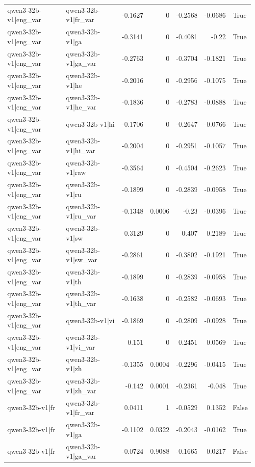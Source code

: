\begin{table}
\begin{tabular}{l l r r r r l}
qwen3-32b-v1|eng_var & qwen3-32b-v1|fr_var & -0.1627 & 0 & -0.2568 & -0.0686 & True \\
qwen3-32b-v1|eng_var & qwen3-32b-v1|ga & -0.3141 & 0 & -0.4081 & -0.22 & True \\
qwen3-32b-v1|eng_var & qwen3-32b-v1|ga_var & -0.2763 & 0 & -0.3704 & -0.1821 & True \\
qwen3-32b-v1|eng_var & qwen3-32b-v1|he & -0.2016 & 0 & -0.2956 & -0.1075 & True \\
qwen3-32b-v1|eng_var & qwen3-32b-v1|he_var & -0.1836 & 0 & -0.2783 & -0.0888 & True \\
qwen3-32b-v1|eng_var & qwen3-32b-v1|hi & -0.1706 & 0 & -0.2647 & -0.0766 & True \\
qwen3-32b-v1|eng_var & qwen3-32b-v1|hi_var & -0.2004 & 0 & -0.2951 & -0.1057 & True \\
qwen3-32b-v1|eng_var & qwen3-32b-v1|raw & -0.3564 & 0 & -0.4504 & -0.2623 & True \\
qwen3-32b-v1|eng_var & qwen3-32b-v1|ru & -0.1899 & 0 & -0.2839 & -0.0958 & True \\
qwen3-32b-v1|eng_var & qwen3-32b-v1|ru_var & -0.1348 & 0.0006 & -0.23 & -0.0396 & True \\
qwen3-32b-v1|eng_var & qwen3-32b-v1|sw & -0.3129 & 0 & -0.407 & -0.2189 & True \\
qwen3-32b-v1|eng_var & qwen3-32b-v1|sw_var & -0.2861 & 0 & -0.3802 & -0.1921 & True \\
qwen3-32b-v1|eng_var & qwen3-32b-v1|th & -0.1899 & 0 & -0.2839 & -0.0958 & True \\
qwen3-32b-v1|eng_var & qwen3-32b-v1|th_var & -0.1638 & 0 & -0.2582 & -0.0693 & True \\
qwen3-32b-v1|eng_var & qwen3-32b-v1|vi & -0.1869 & 0 & -0.2809 & -0.0928 & True \\
qwen3-32b-v1|eng_var & qwen3-32b-v1|vi_var & -0.151 & 0 & -0.2451 & -0.0569 & True \\
qwen3-32b-v1|eng_var & qwen3-32b-v1|zh & -0.1355 & 0.0004 & -0.2296 & -0.0415 & True \\
qwen3-32b-v1|eng_var & qwen3-32b-v1|zh_var & -0.142 & 0.0001 & -0.2361 & -0.048 & True \\
qwen3-32b-v1|fr & qwen3-32b-v1|fr_var & 0.0411 & 1 & -0.0529 & 0.1352 & False \\
qwen3-32b-v1|fr & qwen3-32b-v1|ga & -0.1102 & 0.0322 & -0.2043 & -0.0162 & True \\
qwen3-32b-v1|fr & qwen3-32b-v1|ga_var & -0.0724 & 0.9088 & -0.1665 & 0.0217 & False \\

\end{tabular}
\end{table}
